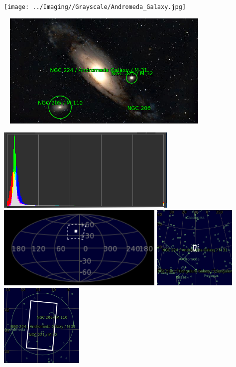 \texttt{[image: ../Imaging//Grayscale/Andromeda\_Galaxy.jpg]}
\begin{center}
 \ \newpage
\includegraphics[width=0.75\textwidth]{../Imaging//Annotated/Andromeda_Galaxy_Annotated.jpg}

\includegraphics[height=4cm]{../Imaging//Annotated/Andromeda_Galaxy_Hist}
\includegraphics[height=4cm]{../Imaging//Annotated/Andromeda_Galaxy_Globe.jpg}
\includegraphics[height=4cm]{../Imaging//Annotated/Andromeda_Galaxy_Close.jpg}
\includegraphics[height=4cm]{../Imaging//Annotated/Andromeda_Galaxy_Closer.jpg}
\end{center}
